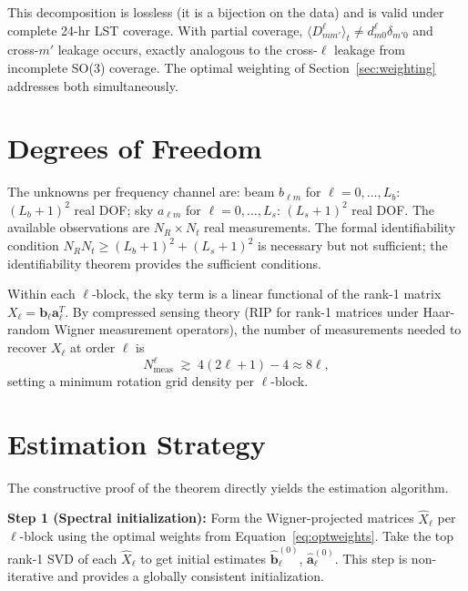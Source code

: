 \documentclass{aastex631}
\newcommand{\blm}{b_{\ell m}}
\newcommand{\alm}{a_{\ell m}}
\theoremstyle{plain}
\theoremstyle{remark}
\begin{document}
This decomposition is lossless (it is a bijection on the data) and
is valid under complete 24-hr LST coverage.
With partial coverage, $\langle D^\ell_{mm'}\rangle_t \neq
d^\ell_{m0}\delta_{m'0}$ and cross-$m'$ leakage occurs, exactly
analogous to the cross-$\ell$ leakage from incomplete SO(3) coverage.
The optimal weighting of Section~\ref{sec:weighting} addresses both
simultaneously.

\section{Degrees of Freedom} \label{sec:dof}

The unknowns per frequency channel are:
beam $\blm$ for $\ell = 0,\ldots,L_b$: $(L_b+1)^2$ real DOF;
sky $\alm$ for $\ell = 0,\ldots,L_s$: $(L_s+1)^2$ real DOF.
The available observations are $N_R \times N_t$ real measurements.
The formal identifiability condition $N_R N_t \geq (L_b+1)^2 +
(L_s+1)^2$ is necessary but not sufficient; the identifiability
theorem provides the sufficient conditions.

Within each $\ell$-block, the sky term is a linear functional of the
rank-1 matrix $X_\ell = \mathbf{b}_\ell \mathbf{a}_\ell^T$.
By compressed sensing theory (RIP for rank-1 matrices under
Haar-random Wigner measurement operators), the number of measurements
needed to recover $X_\ell$ at order $\ell$ is
\begin{equation}
  N_\mathrm{meas}^\ell \;\gtrsim\; 4(2\ell+1) - 4 \approx 8\ell,
\end{equation}
setting a minimum rotation grid density per $\ell$-block.

\section{Estimation Strategy} \label{sec:estimation}

The constructive proof of the theorem directly yields the estimation
algorithm.

\textbf{Step 1 (Spectral initialization):}
Form the Wigner-projected matrices $\hat{X}_\ell$ per $\ell$-block
using the optimal weights from Equation~\ref{eq:optweights}.
Take the top rank-1 SVD of each $\hat{X}_\ell$ to get initial
estimates $\hat{\mathbf{b}}^{(0)}_\ell$, $\hat{\mathbf{a}}^{(0)}_\ell$.
This step is non-iterative and provides a globally consistent
initialization.
\end{document}
